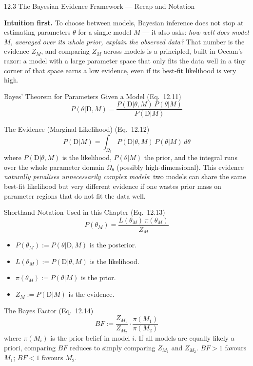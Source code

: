 \documentclass[aspectratio=169,10pt]{beamer}
\newcommand{\D}{\mathrm{D}}
\begin{document}
\begin{frame}[allowframebreaks]{12.3 The Bayesian Evidence Framework --- Recap and Notation}

\textbf{Intuition first.} To choose between models, Bayesian inference does not stop at estimating parameters $\theta$ for a single model $M$ --- it also asks: \emph{how well does model $M$, averaged over its whole prior, explain the observed data?} That number is the evidence $Z_M$, and comparing $Z_M$ across models is a principled, built-in Occam's razor: a model with a large parameter space that only fits the data well in a tiny corner of that space earns a low evidence, even if its best-fit likelihood is very high.

\begin{block}{Bayes' Theorem for Parameters Given a Model (Eq.~12.11)}
\[
  P(\theta|\D,M) = \frac{P(\D|\theta,M)\,P(\theta|M)}{P(\D|M)}
\]
\end{block}

\begin{block}{The Evidence (Marginal Likelihood) (Eq.~12.12)}
\[
  P(\D|M) = \int_{\Omega_\theta} P(\D|\theta,M)\,P(\theta|M)\,d\theta
\]
where $P(\D|\theta,M)$ is the likelihood, $P(\theta|M)$ the prior, and the integral runs over the whole parameter domain $\Omega_\theta$ (possibly high-dimensional). This evidence \emph{naturally penalises unnecessarily complex models}: two models can share the same best-fit likelihood but very different evidence if one wastes prior mass on parameter regions that do not fit the data well.
\end{block}

\framebreak

\begin{block}{Shorthand Notation Used in this Chapter (Eq.~12.13)}
\[
  P(\theta_M) = \frac{L(\theta_M)\,\pi(\theta_M)}{Z_M}
\]
\begin{itemize}
  \item $P(\theta_M) := P(\theta|\D,M)$ is the posterior.
  \item $L(\theta_M) := P(\D|\theta,M)$ is the likelihood.
  \item $\pi(\theta_M) := P(\theta|M)$ is the prior.
  \item $Z_M := P(\D|M)$ is the evidence.
\end{itemize}
\end{block}

\begin{block}{The Bayes Factor (Eq.~12.14)}
\[
  BF := \frac{Z_{M_1}}{Z_{M_2}}\cdot\frac{\pi(M_1)}{\pi(M_2)}
\]
where $\pi(M_i)$ is the prior belief in model $i$. If all models are equally likely a priori, comparing $BF$ reduces to simply comparing $Z_{M_1}$ and $Z_{M_2}$. $BF>1$ favours $M_1$; $BF<1$ favours $M_2$.
\end{block}


\end{frame}
\end{document}
